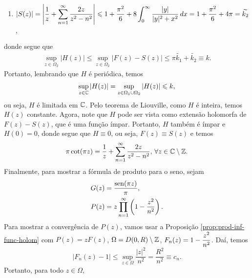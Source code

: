 \begin{exemplo}
\begin{enumerate}
            \item $|S(z)| = \displaystyle{ 
            \left| \frac{1}{z} + \sum_{n=1}^{\infty} \frac{2z}{z^2 - n^2} \right| 
            \leqslant1 + \frac{\pi^2}{6} + 8\int_0^{\infty} \frac{|y|}{|y|^2 + x^2} \, dx
            = 1 + \frac{\pi^2}{6} + 4\pi =
            \widetilde{k_2}}$,
        \end{enumerate}
        donde segue que
        \begin{align*}
            \sup_{z\in\Omega_2} |H(z)| \leq 
            \sup_{z\in\Omega_2} |F(z) - S(z)| \leq
            \pi\widetilde{k_1} + \widetilde{k_2} \equiv
            k.
        \end{align*}
        Portanto, lembrando que $H$ é periódica, temos
        \begin{equation*}
            \sup_{z\in\mathbb{C}} |H(z)| =
            \sup_{z\in\Omega_1\cup\Omega_2} |H(z)| \leqslant
            k,
        \end{equation*}
        ou seja, $H$ é limitada em $\mathbb{C}$.
        Pelo teorema de Liouville, como $H$ é inteira, temos
        $H(z)$ constante. 
        Agora, note que $H$ pode ser vista como extensão holomorfa de $F(z) - S(z)$,
        que é uma função ímpar. Portanto, $H$ 
        também é ímpar e $H(0) = 0$, donde segue 
        que $H\equiv 0$, ou seja, $F(z) \equiv S(z)$ e temos
        \begin{equation*}
            \pi\cot(\pi z) = \frac{1}{z} + \sum_{n=1}^{\infty} \frac{2z}{z^2 - n^2},
            \, \forall z\in\mathbb{C}\setminus\mathbb{Z}.
        \end{equation*}
        Finalmente, para mostrar a fórmula de produto para o seno, sejam
        \begin{align*}
            G(z) &= \frac{\operatorname{sen}(\pi z)}{\pi} , \\
            P(z) &= z\prod_{n=1}^{\infty} \left( 1 - \frac{z^2}{n^2} \right).
        \end{align*}
        Para mostrar a convergência de $P(z)$, vamos usar a 
        Proposição \ref{prop:prod-inf-func-holom} com $P(z) = zF(z)$, 
        $\Omega = D(0,R)\setminus\mathbb{Z}$,
        $F_n(z) = 1 - \displaystyle{ \frac{z^2}{n^2} }$. Daí, temos
        \begin{equation*}
            |F_n(z) - 1| \leq \sup_{z\in\Omega} \frac{|z|^2}{n^2} = \frac{R^2}{n^2}
            \equiv c_n.
        \end{equation*}
        Portanto, para todo $z\in\Omega$,

\end{exemplo}
